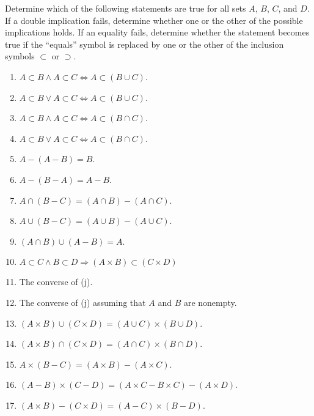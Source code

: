 \begin{exercise}\label{chapter1:section1:exercise2}
    Determine which of the following statements are true for all sets $A$, $B$, $C$, and $D$. If a double implication fails, determine whether one or the other of the possible implications holds. If an equality fails, determine whether the statement becomes true if the ``equals'' symbol is replaced by one or the other of the inclusion symbols $\subset$ or $\supset$.
    \begin{enumerate}[label={(\alph*)}]
        \item $A\subset B \land A\subset C \Leftrightarrow A\subset (B\cup C)$.
        \item $A\subset B \lor A\subset C \Leftrightarrow A\subset (B\cup C)$.
        \item $A\subset B \land A\subset C \Leftrightarrow A\subset (B\cap C)$.
        \item $A\subset B \lor A\subset C \Leftrightarrow A\subset (B\cap C)$.
        \item $A - (A - B) = B$.
        \item $A - (B - A) = A - B$.
        \item $A\cap (B - C) = (A\cap B) - (A\cap C)$.
        \item $A\cup (B - C) = (A\cup B) - (A\cup C)$.
        \item $(A\cap B) \cup (A - B) = A$.
        \item $A\subset C\land B\subset D \Rightarrow (A\times B)\subset (C\times D)$
        \item The converse of (j).
        \item The converse of (j) assuming that $A$ and $B$ are nonempty.
        \item $(A\times B)\cup (C\times D) = (A\cup C)\times (B\cup D)$.
        \item $(A\times B)\cap (C\times D) = (A\cap C)\times (B\cap D)$.
        \item $A\times (B - C) = (A\times B) - (A\times C)$.
        \item $(A - B)\times (C - D) = (A\times C - B\times C) - (A\times D)$.
        \item $(A\times B) - (C\times D) = (A - C)\times (B - D)$.
    \end{enumerate}
\end{exercise}

